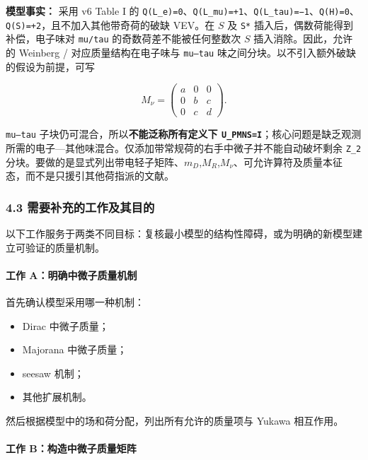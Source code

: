 \documentclass[
  chinese,
  UTF8]{ctexart}
\providecommand{\tightlist}{%
  \setlength{\itemsep}{0pt}\setlength{\parskip}{0pt}}
\begin{document}
\textbf{模型事实：} 采用 v6 Table I 的
\texttt{Q(L\_e)=0}、\texttt{Q(L\_mu)=+1}、\texttt{Q(L\_tau)=−1}、\texttt{Q(H)=0}、\texttt{Q(S)=+2}，且不加入其他带奇荷的破缺
VEV。在 \(S\) 及 \texttt{S*} 插入后，偶数荷能得到补偿，电子味对
\texttt{mu/tau} 的奇数荷差不能被任何整数次 \(S\) 插入消除。因此，允许的
Weinberg / 对应质量结构在电子味与 \texttt{mu–tau}
味之间分块。以不引入额外破缺的假设为前提，可写

\[
 M_\nu=\begin{pmatrix}a&0&0\\0&b&c\\0&c&d\end{pmatrix}.
\]

\texttt{mu–tau} 子块仍可混合，所以\textbf{不能泛称所有定义下
\texttt{U\_PMNS=I}}；核心问题是缺乏观测所需的电子---其他味混合。仅添加带常规荷的右手中微子并不能自动破坏剩余
\texttt{Z\_2}
分块。要做的是显式列出带电轻子矩阵、\(m_D\),\(M_R\),\(M_\nu\)、可允许算符及质量本征态，而不是只援引其他荷指派的文献。

\subsubsection{4.3 需要补充的工作及其目的}\label{major-3-step-3}

以下工作服务于两类不同目标：复核最小模型的结构性障碍，或为明确的新模型建立可验证的质量机制。

\paragraph{工作
A：明确中微子质量机制}\label{ux5de5ux4f5c-aux660eux786eux4e2dux5faeux5b50ux8d28ux91cfux673aux5236}

首先确认模型采用哪一种机制：

\begin{itemize}
\tightlist
\item
  Dirac 中微子质量；
\item
  Majorana 中微子质量；
\item
  seesaw 机制；
\item
  其他扩展机制。
\end{itemize}

然后根据模型中的场和荷分配，列出所有允许的质量项与 Yukawa 相互作用。

\paragraph{工作
B：构造中微子质量矩阵}\label{ux5de5ux4f5c-bux6784ux9020ux4e2dux5faeux5b50ux8d28ux91cfux77e9ux9635}
\end{document}
